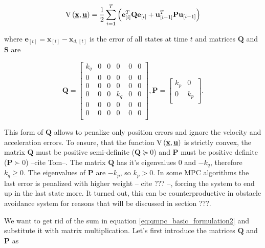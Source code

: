 \documentclass{article}
\begin{document}
\begin{equation}
\label{eq:qmpc_sum}
\mathrm{V}\left(\textbf{\underline{x}}, \textbf{\underline{u}}\right) = \frac{1}{2}\sum_{i=1}^{T}\left(\textbf{e}^T_{[i]}\textbf{Q}\textbf{e}_{[i]} + \textbf{u}^T_{[i-1]}\textbf{P}\textbf{u}_{[i-1]}\right)
\end{equation}

where $\textbf{e}_{[t]} = \textbf{x}_{[t]} - \textbf{x}_{d,[t]}$ is the error of all states at time $t$  and matrices $\textbf{Q}$ and $\textbf{S}$ are

\begin{equation}
\label{eq:qmpc_weighting_matrices_simple}
\textbf{Q} = \begin{bmatrix}
k_q & 0 & 0 & 0 & 0 & 0 \\
0 & 0 & 0 & 0 & 0 & 0 \\
0 & 0 & 0 & 0 & 0 & 0 \\
0 & 0 & 0 & k_q & 0 & 0 \\
0 & 0 & 0 & 0 & 0 & 0 \\
0 & 0 & 0 & 0 & 0 & 0 \\
\end{bmatrix}, 
\textbf{P} = \begin{bmatrix}
k_p & 0\\
0 & k_p\\
\end{bmatrix}.
\end{equation}

This form of $\textbf{Q}$ allows to penalize only position errors and ignore the velocity and acceleration errors. To ensure, that the function $\mathrm{V}\left(\textbf{\underline{x}}, \textbf{\underline{u}}\right)$ is strictly convex, the matrix $\textbf{Q}$ must be positive semi-definite ($\textbf{Q} \succeq 0$) and $\textbf{P}$ must be positive definite ($\textbf{P} \succ 0$) --cite Tom--. The matrix $\textbf{Q}$ has it's eigenvalues $0$ and $-k_q$, therefore $k_q \geq 0$. The eigenvalues of $\textbf{P}$ are $-k_p$, so $k_p > 0$. In some MPC algorithms the last error is penalized with higher weight -- cite ??? --, forcing the system to end up in the last state more. It turned out, this can be counterproductive in obstacle avoidance system for reasons that will be discussed in section ???.

We want to get rid of the sum in equation \ref{eq:qmpc_basic_formulation2} and substitute it with matrix multiplication. Let's first introduce the matrices $\textbf{\^Q}$ and $\textbf{\^P}$ as 
\end{document}
